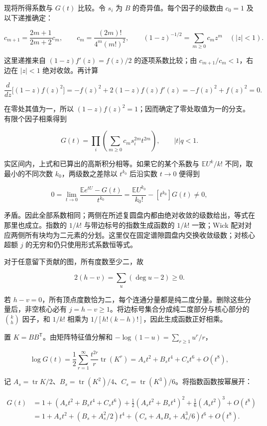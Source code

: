 \documentclass[11pt,a4paper]{article}
\begin{document}
现将所得系数与 \(G(t)\) 比较。令 \(s_i\) 为 \(B\) 的奇异值。每个因子的级数由 \(c_0=1\) 及以下递推确定：

\[c_{m+1}=\frac{2m+1}{2m+2}c_m,
\qquad
c_m=\frac{(2m)!}{4^m(m!)^2},
\qquad
(1-z)^{-1/2}=\sum_{m\ge0}c_mz^m\quad(|z|<1).\]

这里递推来自 \((1-z)f'(z)=f(z)/2\) 的逐项系数比较；由 \(c_{m+1}/c_m<1\)，右边在 \(|z|<1\) 绝对收敛。再计算

\[\frac{d}{dz}\bigl[(1-z)f(z)^2\bigr]
=-f(z)^2+2(1-z)f(z)f'(z)
=-f(z)^2+f(z)^2=0.\]

在零处其值为一，所以 \((1-z)f(z)^2=1\)；因而确定了零处取值为一的分支。有限个因子相乘得到

\[G(t)=\prod_i\left(\sum_{m\ge0}c_m s_i^{2m}t^{2m}\right),
\qquad |t|q<1.\]

实区间内，上式和已算出的高斯积分相等。如果它的某个系数与 \(\mathbb E U^k/k!\) 不同，取最小的不同次数 \(k_0\)，两级数之差除以 \(t^{k_0}\) 后沿实数 \(t\to0\) 便得到

\[0=\lim_{t\to0}\frac{\mathbb Ee^{tU}-G(t)}{t^{k_0}}
=\frac{\mathbb E U^{k_0}}{k_0!}-[t^{k_0}]G(t)\ne0,\]

矛盾。因此全部系数相同；两侧在所述复圆盘内都由绝对收敛的级数给出，等式在那里也成立。指数的 \(1/k!\) 与带边标号的指数生成函数的 \(1/k!\) 一致；Wick 配对对应两侧所有块均为二元素的分划。这里仅在固定谱隙圆盘内交换收敛级数；对核心超额 \(j\) 的无穷和仍只使用形式系数恒等式。

对于任意留下贡献的图，所有度数至少二，故

\[2(h-v)=\sum_{u}(\deg u-2)\ge0.\]

若 \(h-v=0\)，所有顶点度数恰为二，每个连通分量都是纯二度分量。删除这些分量后，非空核心必有 \(j=h-v\ge1\)。将边标号集合分成纯二度部分与核心部分的 \(\binom kh\) 因子，和 \(1/k!\) 相乘为 \(1/[h!(k-h)!]\)，因此生成函数正好相乘。

置 \(K=BB^{\mathsf T}\)。由矩阵特征值分解和 \(-\log(1-u)=\sum_{r\ge1}u^r/r\)，

\[\log G(t)=\frac12\sum_{r=1}^{\infty}\frac{t^{2r}}r\operatorname{tr}(K^r)
=A_st^2+B_st^4+C_st^6+O(t^8),\]

记 \(A_s=\operatorname{tr}K/2\)、\(B_s=\operatorname{tr}(K^2)/4\)、\(C_s=\operatorname{tr}(K^3)/6\)。将指数函数按幂展开：

\[\begin{aligned}
G(t)
&=1+(A_st^2+B_st^4+C_st^6)
+\frac12(A_st^2+B_st^4)^2+\frac16(A_st^2)^3+O(t^8)\\
&=1+A_st^2+(B_s+A_s^2/2)t^4
+(C_s+A_sB_s+A_s^3/6)t^6+O(t^8).
\end{aligned}\]
\end{document}
